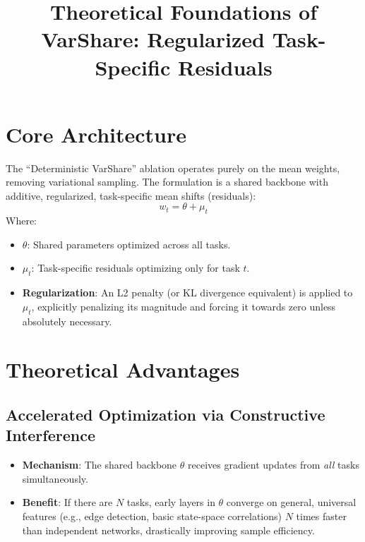 \documentclass[11pt,a4paper]{article}
\title{Theoretical Foundations of VarShare: Regularized Task-Specific Residuals}
\author{}
\date{}
\begin{document}
\maketitle

\section{Core Architecture}
The ``Deterministic VarShare'' ablation operates purely on the mean weights, removing variational sampling. The formulation is a shared backbone with additive, regularized, task-specific mean shifts (residuals):
\[ w_t = \theta + \mu_t \]
Where:
\begin{itemize}
    \item $\theta$: Shared parameters optimized across all tasks.
    \item $\mu_t$: Task-specific residuals optimizing only for task $t$.
    \item \textbf{Regularization}: An L2 penalty (or KL divergence equivalent) is applied to $\mu_t$, explicitly penalizing its magnitude and forcing it towards zero unless absolutely necessary.
\end{itemize}

\section{Theoretical Advantages}

\subsection{Accelerated Optimization via Constructive Interference}
\begin{itemize}
    \item \textbf{Mechanism}: The shared backbone $\theta$ receives gradient updates from \textit{all} tasks simultaneously. 
    \item \textbf{Benefit}: If there are $N$ tasks, early layers in $\theta$ converge on general, universal features (e.g., edge detection, basic state-space correlations) $N$ times faster than independent networks, drastically improving sample efficiency.
\end{itemize}
\end{document}
